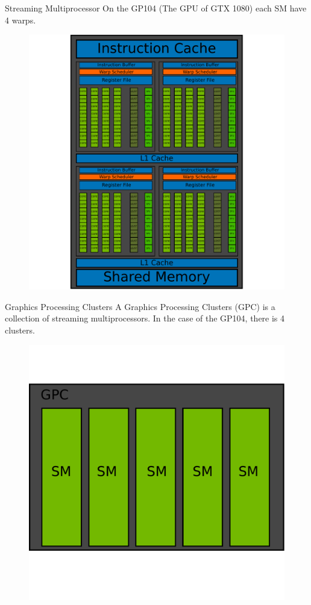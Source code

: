 \documentclass{beamer}
\begin{document}
\begin{frame}{Streaming Multiprocessor}
	On the GP104 (The GPU of GTX 1080) each SM have 4 warps. 
	\begin{figure}
		\includegraphics[scale=0.3]{figures/SM.pdf}
	\end{figure}
\end{frame}

\begin{frame}{Graphics Processing Clusters}
	A Graphics Processing Clusters (GPC) is a collection of streaming multiprocessors. In the case of the GP104, there is 4 clusters.
	\begin{figure}
		\includegraphics[scale=0.3]{figures/GPC.pdf}
	\end{figure}
\end{frame}
\end{document}
